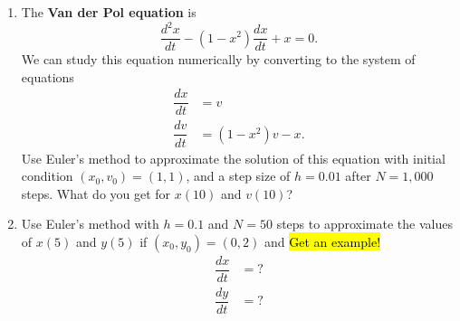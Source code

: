 \documentclass[10pt]{article}
\begin{document}
\begin{enumerate}
\setcounter{enumi}{\theenumCount}
\item The \textbf{Van der Pol equation} is 
$$\dfrac{d^2 x}{dt} - (1-x^2) \dfrac{dx}{dt} + x = 0.$$
We can study this equation numerically by converting to the system of equations
\begin{align*}
\dfrac{dx}{dt} &= v \\ 
\dfrac{dv}{dt} &= (1-x^2)v - x.
\end{align*}
Use Euler's method to approximate the solution of this equation with initial condition $(x_0,v_0) = (1,1)$, and a step size of $h = 0.01$ after $N = 1{,}000$ steps.  What do you get for $x(10)$ and $v(10)$?  
\vfill




\item Use Euler's method with $h = 0.1$ and $N = 50$ steps to approximate the values of $x(5)$ and $y(5)$ if $(x_0, y_0) = (0,2)$ and \hl{Get an example!}
\begin{align*}
\dfrac{dx}{dt} &= ? \\ 
\dfrac{dy}{dt} &= ?
\end{align*}
\vfill

\end{enumerate}
\end{document}
